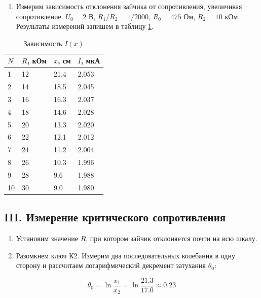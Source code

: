 \documentclass[a4paper,12pt]{article}
\begin{document}
\begin{enumerate}[resume]
    \item Измерим зависимость отклонения зайчика от сопротивления, увеличивая сопротивление. $U_0 = 2$ В, $R_1/R_2 = 1/2000$, $R_0 = 475$ Ом, $R_2 = 10$ кОм. Результаты измерений запишем в таблицу \ref{table:1}.
\end{enumerate}

\FloatBarrier
\begin{table}[!h]
    \centering
    \caption{Зависимость $I(x)$}
    \begin{tabular}{|l|l|l|l|}
        \hline
        $N$  & $R$, кОм & $x$, см & $I$, мкА \\ \hline
        1  & 12     & 21.4  & 2.053  \\ \hline
        2  & 14     & 18.5  & 2.045  \\ \hline
        3  & 16     & 16.3  & 2.037  \\ \hline
        4  & 18     & 14.6  & 2.028  \\ \hline
        5  & 20     & 13.3  & 2.020  \\ \hline
        6  & 22     & 12.1  & 2.012  \\ \hline
        7  & 24     & 11.2  & 2.004  \\ \hline
        8  & 26     & 10.3  & 1.996  \\ \hline
        9  & 28     & 9.6   & 1.988  \\ \hline
        10 & 30     & 9.0   & 1.980  \\ \hline
    \end{tabular}
    \label{table:1}
\end{table}

\subsection*{III. Измерение критического сопротивления}

\begin{enumerate}[resume]
    \item Установим значение $R$, при котором зайчик отклоняется почти на всю шкалу.
    \item Разомкнем ключ К2. Измерим два последовательных колебания в одну сторону и рассчитаем логарифмический декремент затухания $\theta_0$:
\end{enumerate}

\begin{equation*}
    \theta_0 = \ln {\frac{x_1}{x_2}} = \ln {\frac{21.3}{17.0}} \approx 0.23
\end{equation*}
\end{document}
